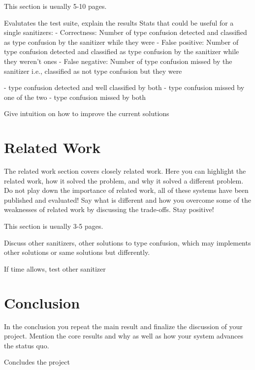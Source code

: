 \documentclass[a4paper,11pt,oneside]{report}
\begin{document}
This section is usually 5-10 pages.

Evalutates the test suite, explain the results
Stats that could be useful for a single sanitizers:
- Correctness: Number of type confusion detected and classified as type confusion by the sanitizer while they were
- False positive: Number of type confusion detected and classified as type confusion by the sanitizer while they weren't ones
- False negative: Number of type confusion missed by the sanitizer i.e., classified as not type confusion but they were

- type confusion detected and well classified by both
- type confusion missed by one of the two
- type confusion missed by both

Give intuition on how to improve the current solutions

\chapter{Related Work}

The related work section covers closely related work. Here you can highlight
the related work, how it solved the problem, and why it solved a different
problem. Do not play down the importance of related work, all of these
systems have been published and evaluated! Say what is different and how
you overcome some of the weaknesses of related work by discussing the 
trade-offs. Stay positive!

This section is usually 3-5 pages.

Discuss other sanitizers, other solutions to type confusion,
which may implements other solutions or same solutions but differently.

If time allows, test other sanitizer




\chapter{Conclusion}

In the conclusion you repeat the main result and finalize the discussion of
your project. Mention the core results and why as well as how your system
advances the status quo.

Concludes the project 
\cleardoublepage
{}
{}
\printbibliography

%
%
\end{document}

